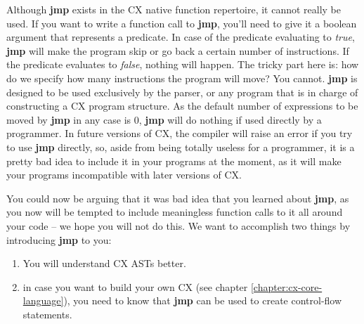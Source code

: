 \documentclass[11pt,fleqn,openany]{book} %
\begin{document}

Although \textbf{jmp} exists in the CX native function repertoire, it cannot really be used. If you want to write a function call to \textbf{jmp}, you'll need to give it a boolean argument that represents a predicate. In case of the predicate evaluating to \emph{true}, \textbf{jmp} will make the program skip or go back a certain number of instructions. If the predicate evaluates to \emph{false}, nothing will happen. The tricky part here is: how do we specify how many instructions the program will move? You cannot. \textbf{jmp} is designed to be used exclusively by the parser, or any program that is in charge of constructing a CX program structure. As the default number of expressions to be moved by \textbf{jmp} in any case is 0, \textbf{jmp} will do nothing if used directly by a programmer. In future versions of CX, the compiler will raise an error if you try to use \textbf{jmp} directly, so, aside from being totally useless for a programmer, it is a pretty bad idea to include it in your programs at the moment, as it will make your programs incompatible with later versions of CX.

You could now be arguing that it was bad idea that you learned about \textbf{jmp}, as you now will be tempted to include meaningless function calls to it all around your code -- we hope you will not do this. We want to accomplish two things by introducing \textbf{jmp} to you:
\begin{enumerate}
    \item You will understand CX ASTs better.
    \item in case you want to build your own CX (see chapter \ref{chapter:cx-core-language}), you need to know that \textbf{jmp} can be used to create control-flow statements.
\end{enumerate}
\end{document}
